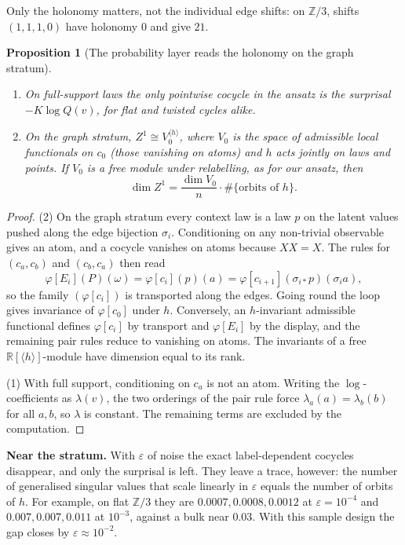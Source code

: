\documentclass[11pt]{article}
\newtheorem{proposition}[theorem]{Proposition}
\theoremstyle{definition}
\theoremstyle{remark}
\newcommand{\Z}{\mathbb{Z}}
\newcommand{\R}{\mathbb{R}}
\begin{document}
Only the holonomy matters, not the individual edge shifts: on $\Z/3$, shifts $(1,1,1,0)$ have holonomy $0$ and give $21$.

\begin{proposition}[The probability layer reads the holonomy on the graph stratum]\label{prop:pwgraph}
\leavevmode
\begin{enumerate}
  \item On full-support laws the only pointwise cocycle in the ansatz is the surprisal $-K\log Q(v)$, for flat and twisted cycles alike.
  \item On the graph stratum, $Z^1\cong V_0^{\langle h\rangle}$, where $V_0$ is the space of admissible local functionals on $c_0$ (those vanishing on atoms) and $h$ acts jointly on laws and points. If $V_0$ is a free module under relabelling, as for our ansatz, then
  \[
  \dim Z^1=\frac{\dim V_0}{n}\cdot\#\{\text{orbits of }h\}.
  \]
\end{enumerate}
\end{proposition}
\begin{proof}
(2) On the graph stratum every context law is a law $p$ on the latent values pushed along the edge bijection $\sigma_i$. Conditioning on any non-trivial observable gives an atom, and a cocycle vanishes on atoms because $XX=X$. The rules for $(c_a,c_b)$ and $(c_b,c_a)$ then read
\[
\varphi[E_i](P)(\omega)=\varphi[c_i](p)(a)=\varphi[c_{i+1}](\sigma_{i*}p)(\sigma_i a),
\]
so the family $(\varphi[c_i])$ is transported along the edges. Going round the loop gives invariance of $\varphi[c_0]$ under $h$. Conversely, an $h$-invariant admissible functional defines $\varphi[c_i]$ by transport and $\varphi[E_i]$ by the display, and the remaining pair rules reduce to vanishing on atoms. The invariants of a free $\R[\langle h\rangle]$-module have dimension equal to its rank.

(1) With full support, conditioning on $c_a$ is not an atom. Writing the $\log$-coefficients as $\lambda(v)$, the two orderings of the pair rule force $\lambda_a(a)=\lambda_b(b)$ for all $a,b$, so $\lambda$ is constant. The remaining terms are excluded by the computation.
\end{proof}

\textbf{Near the stratum.} With $\varepsilon$ of noise the exact label-dependent cocycles disappear, and only the surprisal is left. They leave a trace, however: the number of generalised singular values that scale linearly in $\varepsilon$ equals the number of orbits of $h$. For example, on flat $\Z/3$ they are $0.0007,0.0008,0.0012$ at $\varepsilon=10^{-4}$ and $0.007,0.007,0.011$ at $10^{-3}$, against a bulk near $0.03$. With this sample design the gap closes by $\varepsilon\approx10^{-2}$.
\end{document}
